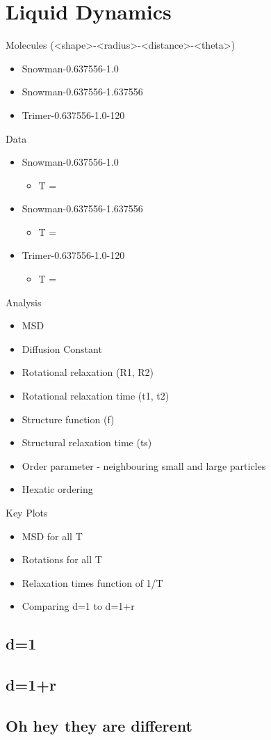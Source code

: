 \chapter{Liquid Dynamics}

Molecules (<shape>-<radius>-<distance>-<theta>)
\begin{itemize}
    \item Snowman-0.637556-1.0
    \item Snowman-0.637556-1.637556
    \item Trimer-0.637556-1.0-120
\end{itemize}


Data
\begin{itemize}
    \item Snowman-0.637556-1.0
        \begin{itemize}
            \item T = 
        \end{itemize}
    \item Snowman-0.637556-1.637556
        \begin{itemize}
            \item T = 
        \end{itemize}
    \item Trimer-0.637556-1.0-120
        \begin{itemize}
            \item T = 
        \end{itemize}
\end{itemize}


Analysis
\begin{itemize}
    \item MSD
    \item Diffusion Constant
    \item Rotational relaxation (R1, R2)
    \item Rotational relaxation time (t1, t2)
    \item Structure function (f)
    \item Structural relaxation time (ts)
    \item Order parameter - neighbouring small and large particles
    \item Hexatic ordering
\end{itemize}

Key Plots
\begin{itemize}
    \item MSD for all T
    \item Rotations for all T
    \item Relaxation times function of 1/T
    \item Comparing d=1 to d=1+r
\end{itemize}


\section{d=1}

\section{d=1+r}

\section{Oh hey they are different}
